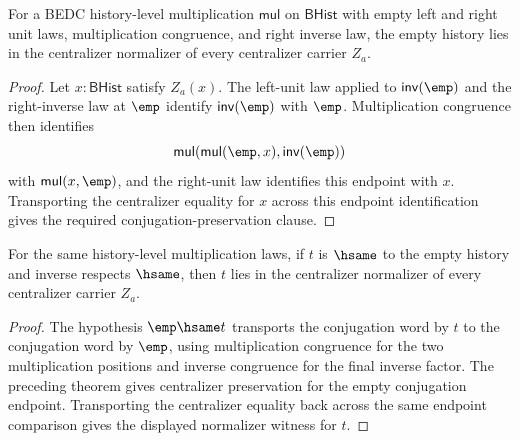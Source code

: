 \begin{theorem}
\label{thm:quotientgroup-centralizer-normalizer-empty-from-empty-unit}
For a BEDC history-level multiplication $\mathsf{mul}$ on $\mathsf{BHist}$ with
empty left and right unit laws, multiplication congruence, and right inverse
law, the empty history lies in the centralizer normalizer of every
centralizer carrier $Z_a$.
\end{theorem}
\begin{proof}
Let $x:\mathsf{BHist}$ satisfy $Z_a(x)$. The left-unit law applied to
$\mathsf{inv}(\emp)$ and the right-inverse law at $\emp$ identify
$\mathsf{inv}(\emp)$ with $\emp$. Multiplication congruence then identifies
$$
\mathsf{mul}(\mathsf{mul}(\emp,x),\mathsf{inv}(\emp))
$$
with $\mathsf{mul}(x,\emp)$, and the right-unit law identifies this endpoint
with $x$. Transporting the centralizer equality for $x$ across this endpoint
identification gives the required conjugation-preservation clause.
\end{proof}

\begin{theorem}
\label{thm:quotientgroup-centralizer-normalizer-empty-hsame-transport}
For the same history-level multiplication laws, if $t$ is $\hsame$ to the
empty history and inverse respects $\hsame$, then $t$ lies in the centralizer
normalizer of every centralizer carrier $Z_a$.
\end{theorem}
\begin{proof}
The hypothesis $\emp\hsame t$ transports the conjugation word by $t$ to the
conjugation word by $\emp$, using multiplication congruence for the two
multiplication positions and inverse congruence for the final inverse factor.
The preceding theorem gives centralizer preservation for the empty
conjugation endpoint. Transporting the centralizer equality back across the
same endpoint comparison gives the displayed normalizer witness for $t$.
\end{proof}
